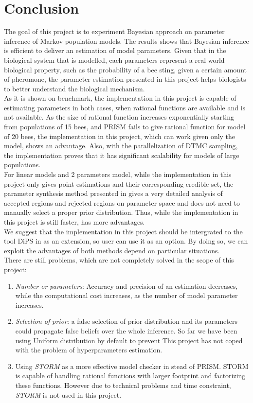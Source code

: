 \documentclass[12pt]{article}
\theoremstyle{definition}
\begin{document}
\section{Conclusion}
The goal of this project is to experiment Bayesian approach on parameter
inference of Markov population models. The results shows that Bayesian inference
is efficient to deliver an estimation of model parameters. Given that in the
biological system that is modelled, each parameters represent a real-world
biological property, such as the probability of a bee sting, given a certain
amount of pheromone, the parameter estimation presented in this project helps
biologists to better understand the biological mechanism.\\
As it is shown on benchmark, the implementation in this project is capable of
estimating parameters in both cases, when rational functions are available and is
not available. As the size of rational function increases exponentially starting
from populations of 15 bees, and PRISM fails to give rational function for model
of 20 bees, the implementation in this project, which can work given only the
model, shows an advantage. Also, with the parallelization of DTMC sampling, the
implementation proves that it has significant scalability for models of large
populations.\\
For linear models and 2 parameters model, while the implementation in this
project only gives point estimations and their corresponding credible set, the
parameter synthesis method presented in \cite{hajnal2019data} gives a very
detailed analysis of accepted regions and rejected regions on parameter space
and does not need to manually select a proper prior distribution. Thus, while
the implementation in this project is still faster, \cite{hajnal2019data} has
more advantages.\\
We suggest that the implementation in this project should be intergrated to the
tool DiPS in \cite{hajnal2019data} as an extension, so user can use it as an
option. By doing so, we can exploit the advantages of both methods depend on
particular situations.\\
There are still problems, which are not completely solved in the scope of this project:
\begin{enumerate}
\item \textit{Number or parameters}: Accuracy and precision of an estimation
  decreases, while the computational cost increases, as the number of model
  parameter increases.
\item \textit{Selection of prior:} a false selection of prior distribution and
  its parameters could propagate false beliefs over the whole inference. So far
  we have been using Uniform distribution by default to prevent 
  This project has not coped with the problem of hyperparameters
  estimation.
\item Using \textit{STORM} \cite{dehnert2017storm} as a more effective model
  checker in stead of PRISM. STORM is capable of handling rational functions
  with larger footprint and factorizing these functions. However due to
  technical problems and time constraint, \textit{STORM} is not used in this project.
\end{enumerate}

\newpage
\printbibliography
\end{document}
